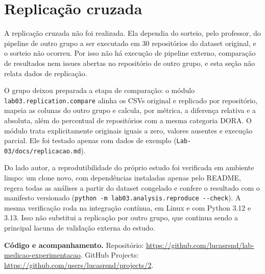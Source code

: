 \section{Replicação cruzada}
\label{sec:replicacao}

A replicação cruzada não foi realizada. Ela dependia do sorteio, pelo
professor, do pipeline de outro grupo a ser executado em 30 repositórios do
dataset original, e o sorteio não ocorreu. Por isso não há execução de pipeline
externo, comparação de resultados nem issues abertas no repositório de outro
grupo, e esta seção não relata dados de replicação.

O grupo deixou preparada a etapa de comparação: o módulo
\texttt{lab03.replication.compare} alinha os CSVs original e replicado por
repositório, mapeia as colunas do outro grupo e calcula, por métrica, a
diferença relativa e a absoluta, além do percentual de repositórios com a mesma
categoria DORA. O módulo trata explicitamente originais iguais a zero, valores
ausentes e execução parcial. Ele foi testado apenas com dados de exemplo
(\texttt{Lab-03/docs/replicacao.md}).

Do lado autor, a reprodutibilidade do próprio estudo foi verificada em
ambiente limpo: um clone novo, com dependências instaladas apenas pelo README,
regera todas as análises a partir do dataset congelado e confere o resultado
com o manifesto versionado (\texttt{python -m lab03.analysis.reproduce
-{}-check}). A mesma verificação roda na integração contínua, em Linux e com
Python 3.12 e 3.13. Isso não substitui a replicação por outro grupo, que
continua sendo a principal lacuna de validação externa do estudo.

\medskip
\noindent\textbf{Código e acompanhamento.} Repositório:
\url{https://github.com/lucasrsnd/lab-medicao-experimentacao}. GitHub Projects:
\url{https://github.com/users/lucasrsnd/projects/2}.
